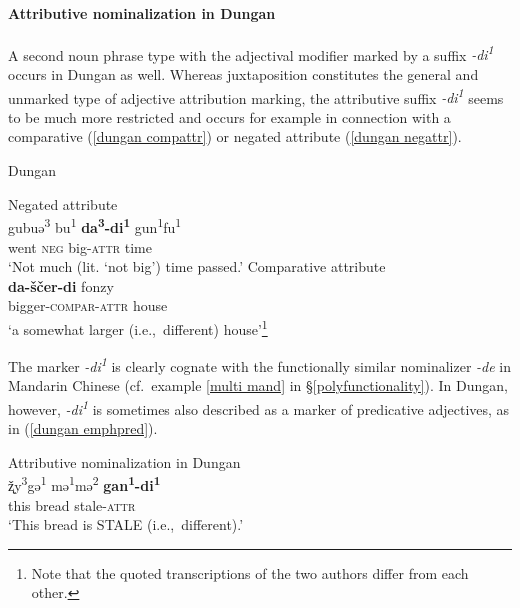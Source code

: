 \paragraph*{Attributive nominalization in Dungan}
A second noun phrase type with the adjectival modifier marked by a suffix \textit{-di\textsuperscript{1}} occurs in Dungan as well. Whereas juxtaposition constitutes the general and unmarked type of adjective attribution marking, the attributive suffix \textit{-di\textsuperscript{1}} seems to be much more restricted and occurs for example in connection with a comparative (\ref{dungan compattr}) or negated attribute (\ref{dungan negattr}).
\begin{exe}
\ex \rm{Dungan}
\begin{xlist}
\ex \rm{Negated attribute \citep[80]{zevachina2001}}\\
\label{dungan negattr}
\gll	gubuə\textsuperscript{3} bu\textsuperscript{1} \textbf{da\textsuperscript{3}-di\textsuperscript{1}} gun\textsuperscript{1}fu\textsuperscript{1}\\
	went \textsc{neg} big-\textsc{attr} time\\
\glt	‘Not much (lit. ‘not big’) time passed.’
\ex \rm{Comparative attribute \citep[480]{kalimov1968}}\\
\label{dungan compattr}
\gll	\textbf{da-ščer-di} fonzy\\
	bigger-\textsc{compar}-\textsc{attr} house\\
\glt	‘a somewhat larger (i.e.,~different) house’\footnote{Note that the quoted transcriptions of the two authors differ from each other.}
\end{xlist}
\end{exe}	
The marker \textit{-di\textsuperscript{1}} is clearly cognate with the functionally similar nominalizer \textit{-de} in Mandarin Chinese (cf.~example \ref{multi mand} in \S\ref{polyfunctionality}). In Dungan, however, \textit{-di\textsuperscript{1}} is sometimes also described as a marker of predicative adjectives, as in (\ref{dungan emphpred}).
\begin{exe}
\ex \rm{Attributive nominalization in Dungan \citep[82]{zevachina2001}}\\
\label{dungan emphpred}
\gll	ž̨y\textsuperscript{3}gə\textsuperscript{1} mə\textsuperscript{1}mə\textsuperscript{2} \textbf{gan\textsuperscript{1}-di\textsuperscript{1}}\\
	this bread stale-\textsc{attr}\\
\glt	‘This bread is STALE (i.e.,~different).’
\end{exe}
